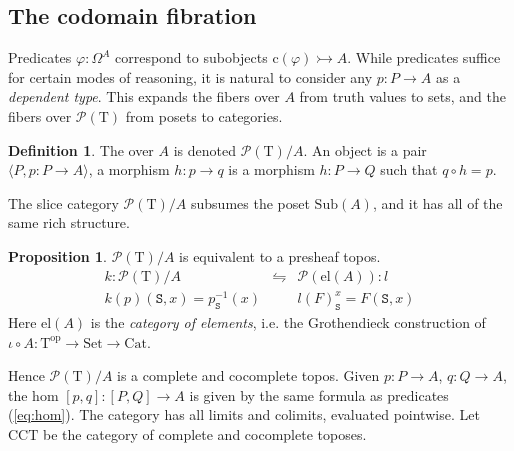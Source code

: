 \documentclass[12pt]{article}
\theoremstyle{definition}
\newtheorem{definition}[theorem]{Definition}
\newtheorem{example}[theorem]{Example}
\newtheorem{proposition}[theorem]{Proposition}
\newcommand{\define}[1]{{\bf \boldmath{#1}}}
\newcommand{\msc}[1]{\mathscr{#1}}
\newcommand{\mrm}[1]{\mathrm{#1}}
\newcommand{\mtt}[1]{\mathtt{#1}}
\newcommand{\rtail}{\rightarrowtail}
\newcommand{\ra}{\Rightarrow}
\newcommand{\op}{\mrm{op}}
\newcommand{\lrh}{\leftrightharpoons}
\newcommand{\T}{\mrm{T}}
\newcommand{\Set}{\mrm{Set}}
\newcommand{\Cat}{\mrm{Cat}}
\newcommand{\Sub}{\mrm{Sub}}
\newcommand{\pow}{\msc{P}}
\newcommand{\ttr}{\mtt{R}}
\newcommand{\tts}{\mtt{S}}
\begin{document}
\subsection{The codomain fibration}
\label{ssec:cod}

Predicates $\varphi:\Omega^A$ correspond to subobjects $\mrm{c}(\varphi)\rtail A$. While predicates suffice for certain modes of reasoning, it is natural to consider any $p:P\to A$ as a \textit{dependent type}. This expands the fibers over $A$ from truth values to sets, and the fibers over $\pow(\T)$ from posets to categories.



\begin{definition}
    The \define{slice category} over $A$ is denoted $\pow(\T)/A$. An object is a pair $\langle P,p:P\to A\rangle$, a morphism $h:p\to q$ is a morphism $h:P\to Q$ such that $q\circ h= p$.
\end{definition}

The slice category $\pow(\T)/A$ subsumes the poset $\Sub(A)$, and it has all of the same rich structure.

\begin{proposition}
    $\pow(\T)/A$ is equivalent to a presheaf topos.
    \[\begin{array}{rcl}
         k:\pow(\T)/A &\lrh & \pow(\mrm{el}(A)):l\\
         k(p)(\tts,x) = p_\tts^{-1}(x) & & l(F)_\tts^x = F(\tts,x)
    \end{array}\]
    Here $\mrm{el}(A)$ is the \textit{category of elements}, i.e. the Grothendieck construction of $\iota\circ A:\T^\op\to \Set\to \Cat$. \cite{sheavesinGL}
\end{proposition}

Hence $\pow(\T)/A$ is a complete and cocomplete topos. Given $p:P\to A$, $q:Q\to A$, the hom $[p,q]:[P,Q]\to A$ is given by the same formula as predicates (\ref{eq:hom}). The category has all limits and colimits, evaluated pointwise. Let $\mrm{CCT}$ be the category of complete and cocomplete toposes.
\end{document}

